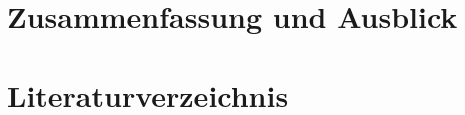 \documentclass[a4paper,11pt,oneside,final,german,openbib,pdftex]{scrbook}
\begin{document}
\chapter{Zusammenfassung und Ausblick}



% 
% 
% 
% 



\chapter{Literaturverzeichnis}




% 
% 
\end{document}
